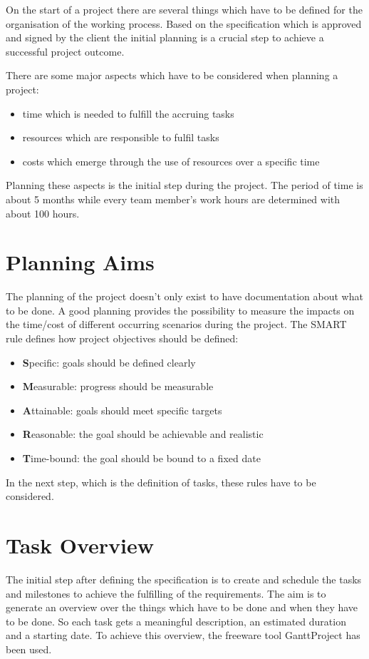 On the start of a project there are several things which have to be defined for
the organisation of the working process. Based on the specification which is
approved and signed by the client the initial planning is a crucial step to
achieve a successful project outcome. 

There are some major aspects which have to be considered when planning a
project:

\begin{itemize}
\item time which is needed to fulfill the accruing tasks
\item resources which are responsible to fulfil tasks
\item costs which emerge through the use of resources over a specific time
\end{itemize}

Planning these aspects is the initial step during the project. The period of
time is about 5 months while every team member's work hours are determined with
about 100 hours.

\section{Planning Aims}

The planning of the project doesn't only exist to have documentation about what
to be done. A good planning provides the possibility to measure the impacts on
the time/cost of different occurring scenarios during the project. The SMART
rule defines how project objectives should be defined:

\begin{itemize}
\item \textbf{S}pecific: goals should be defined clearly
\item \textbf{M}easurable: progress should be measurable
\item \textbf{A}ttainable: goals should meet specific targets 
\item \textbf{R}easonable: the goal should be achievable and realistic
\item \textbf{T}ime-bound: the goal should be bound to a fixed date 
\end{itemize}

In the next step, which is the definition of tasks, these rules have to be
considered. 

\section{Task Overview}
The initial step after defining the specification is to create and schedule the
tasks and milestones to achieve the fulfilling of the requirements. The aim is
to generate an overview over the things which have to be done and when they have
to be done. So each task gets a meaningful description, an estimated duration
and a starting date. To achieve this overview, the freeware tool GanttProject
has been used.

